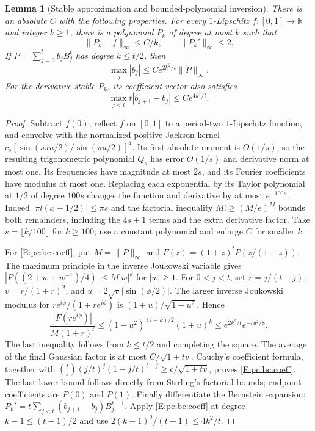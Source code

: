\documentclass[11pt,a4paper]{article}
\newtheorem{lemma}[theorem]{Lemma}
\theoremstyle{definition}
\theoremstyle{remark}
\numberwithin{equation}{section}
\begin{document}
\begin{lemma}[Stable approximation and bounded-polynomial inversion]
\label{E:pc:bc:approx}
There is an absolute $C$ with the following properties.
For every $1$-Lipschitz $f:[0,1]\to\mathbb R$ and integer $k\ge1$, there
is a polynomial $P_k$ of degree at most $k$ such that
\[
 \|P_k-f\|_\infty\le C/k,\qquad \|P_k'\|_\infty\le2.
\]
If $P=\sum_{j=0}^t b_jB_j^t$ has degree $k\le t/2$, then
\begin{equation}\label{E:pc:bc:coeff}
 \max_j|b_j|\le Ce^{2k^2/t}\|P\|_\infty.
\end{equation}
For the derivative-stable $P_k$, its coefficient vector also satisfies
\begin{equation}\label{E:pc:bc:coefflip}
 \max_{j<t}t|b_{j+1}-b_j|\le Ce^{4k^2/t}.
\end{equation}
\end{lemma}
\begin{proof}
Subtract $f(0)$, reflect $f$ on $[0,1]$ to a period-two $1$-Lipschitz
function, and convolve with the normalized positive Jackson kernel
$c_s[\sin(s\pi u/2)/\sin(\pi u/2)]^4$. Its first absolute moment is
$O(1/s)$, so the resulting trigonometric polynomial $Q_s$ has error
$O(1/s)$ and derivative norm at most one. Its frequencies have magnitude
at most $2s$, and its Fourier coefficients have modulus at most one.
Replacing each exponential by its Taylor polynomial at $1/2$ of degree
$100s$ changes the function and derivative by at most $e^{-100s}$.
Indeed $|\pi l(x-1/2)|\le\pi s$ and the factorial inequality
$M!\ge(M/e)^M$ bounds both remainders, including the $4s+1$ terms and the
extra derivative factor. Take $s=\lfloor k/100\rfloor$ for $k\ge100$;
use a constant polynomial and enlarge $C$ for smaller $k$.

For \eqref{E:pc:bc:coeff}, put $M=\|P\|_\infty$ and
$F(z)=(1+z)^tP(z/(1+z))$. The maximum principle in the inverse Joukowski
variable gives
$|P((2+w+w^{-1})/4)|\le M|w|^k$ for $|w|\ge1$.
For $0<j<t$, set $r=j/(t-j)$, $v=r/(1+r)^2$, and
$u=2\sqrt v|\sin(\phi/2)|$. The larger inverse Joukowski modulus for
$re^{i\phi}/(1+re^{i\phi})$ is $(1+u)/\sqrt{1-u^2}$. Hence
\[
 \frac{|F(re^{i\phi})|}{M(1+r)^t}
 \le(1-u^2)^{(t-k)/2}(1+u)^k
 \le e^{2k^2/t}e^{-tu^2/8}.
\]
The last inequality follows from $k\le t/2$ and completing the square.
The average of the final Gaussian factor is at most
$C/\sqrt{1+tv}$. Cauchy's coefficient formula, together with
$\binom tj(j/t)^j(1-j/t)^{t-j}\ge c/\sqrt{1+tv}$, proves
\eqref{E:pc:bc:coeff}. The last lower bound follows directly from Stirling's
factorial bounds; endpoint coefficients are $P(0)$ and $P(1)$.
Finally differentiate the Bernstein expansion:
$P_k'=t\sum_{j<t}(b_{j+1}-b_j)B_j^{t-1}$.
Apply \eqref{E:pc:bc:coeff} at degree $k-1\le(t-1)/2$ and use
$2(k-1)^2/(t-1)\le4k^2/t$.
\end{proof}
\end{document}
